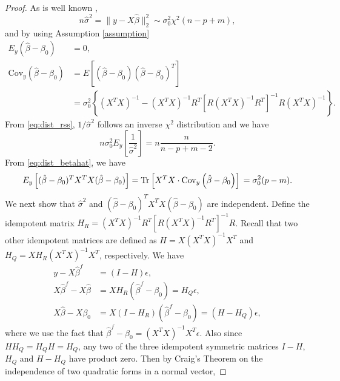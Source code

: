 \begin{proof}
As is well known ,
\begin{equation}
  n\hat\sigma^2 = \lVert y-X\hat{\beta} \rVert_2^2 \sim \sigma_0^2 \chi^2(n-p+m),
  \label{eq:dist_rss}
\end{equation}
and by using Assumption \ref{assumption}
\begin{equation}
\begin{aligned}
E_y\left(\hat{\beta} - \beta_0 \right) &= 0,\\
\text{Cov}_y\left(\hat{\beta} - \beta_0 \right) &= E\left[\left(\hat{\beta} - \beta_0 \right)\left(\hat{\beta} - \beta_0 \right)^T \right]\\
&= \sigma_0^2 \left\{ (X^T X)^{-1} - (X^T X)^{-1}R^T\left[ R(X^T X)^{-1}R^T \right]^{-1} R(X^T X)^{-1} \right\}.
\end{aligned}
\label{eq:dist_betahat}
\end{equation}
From \eqref{eq:dist_rss}, $1/\hat{\sigma}^2$ follows an inverse $\chi^2$ distribution and we have
\begin{equation*}
n \sigma_0^2 E_y\left[ \frac{1}{\hat{\sigma}^2} \right] = n\frac{n}{n-p+m-2}.
\end{equation*}
From \eqref{eq:dist_betahat}, we have
\begin{equation*}
E_y  \left [ (\hat \beta-\beta_0)^T X^T X (\hat \beta-\beta_0) \right ] 
= \text{Tr} \left[ X^T X \cdot \text{Cov}_y \left( \hat{\beta} - \beta_0 \right) \right] \\
= \sigma_0^2 (p-m).
\end{equation*}
We next show that $\hat{\sigma}^2$ and $(\hat \beta-\beta_0)^T X^T X (\hat \beta-\beta_0)$ are independent. Define the idempotent matrix $H_R=(X^T X)^{-1} R^T \left[ R (X^T X)^{-1} R^T \right]^{-1} R$. Recall that two other idempotent matrices are defined as $H=X(X^T X)^{-1} X^T$ and $H_Q = X H_R (X^T X)^{-1} X^T$, respectively. We have
\begin{equation*}
\begin{aligned}
y-X\hat{\beta}^f &= (I-H)\epsilon,\\
X\hat{\beta}^f - X\hat{\beta} &= XH_R(\hat{\beta}^f - \beta_0) =H_Q \epsilon,\\
X\hat{\beta} - X\beta_0 &= X(I-H_R)(\hat{\beta}^f - \beta_0) = (H-H_Q) \epsilon,
\end{aligned}
\end{equation*}
where we use the fact that $\hat{\beta}^f - \beta_0 = (X^T X)^{-1}X^T \epsilon$. Also since $HH_Q=H_QH=H_Q$, any two of the three idempotent symmetric matrices $I-H$, $H_Q$ and $H-H_Q$ have product zero. Then by Craig's Theorem  on the independence of two quadratic forms in a normal vector, 

\end{proof}
